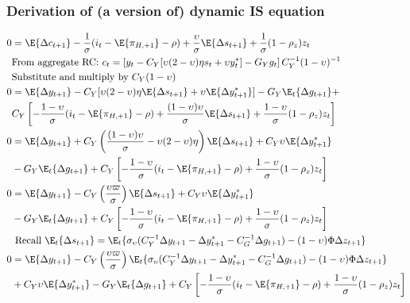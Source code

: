 \subsubsection{Derivation of (a version of) dynamic IS equation}
\begin{align}\label{eq:dynamic_is_beginning}
    0 &= \E \{ \Delta c_{t+1}\} - \frac{1}{\sigma}(i_t - \E \{ \pi_{H,+1}\} - \rho) + \frac{\upsilon}{\sigma}\E \{ \Delta s_{t+1} \} + \frac{1}{\sigma}(1-\rho_z)z_t \\
    &\text{From aggregate RC: $c_t = \left[ y_t - C_Y[\upsilon(2-\upsilon)\eta s_t + \upsilon y_t^*] - G_Y g_t\right] C_Y^{-1}(1-\upsilon)^{-1}$} \nonumber\\
    &\text{Substitute and multiply by $C_Y(1-\upsilon)$}\nonumber\\
    0  &= \E \{ \Delta y_{t+1}\}  - C_Y[\upsilon(2-\upsilon)\eta \E \{\Delta s_{t+1} \} + \upsilon \E \{\Delta y_{t+1}^* \}] -G_Y \E_t\{\Delta g_{t+1}\} + \nonumber\\ 
    &C_Y\left[- \frac{1-\upsilon}{\sigma}(i_t - \E \{ \pi_{H,+1}\} - \rho) + \frac{(1-\upsilon)\upsilon}{\sigma}\E \{ \Delta s_{t+1} \} + \frac{1-\upsilon}{\sigma}(1-\rho_z)z_t \right] \\
    0  &= \E \{ \Delta y_{t+1}\}  + C_Y\left(\frac{(1-\upsilon)\upsilon}{\sigma} - \upsilon(2-\upsilon)\eta\right) \E \{\Delta s_{t+1} \} + C_Y \upsilon \E \{\Delta y_{t+1}^* \} \nonumber\\ 
    &-G_Y \E_t\{\Delta g_{t+1}\} + C_Y\left[- \frac{1-\upsilon}{\sigma}(i_t - \E \{ \pi_{H,+1}\} - \rho)  + \frac{1-\upsilon}{\sigma}(1-\rho_z)z_t \right] \\
    0  &= \E \{ \Delta y_{t+1}\}  - C_Y\left(\frac{\upsilon \varpi}{\sigma}\right) \E \{\Delta s_{t+1} \} + C_Y \upsilon \E \{\Delta y_{t+1}^* \} \nonumber\\
     &-G_Y \E_t\{\Delta g_{t+1}\} + C_Y\left[- \frac{1-\upsilon}{\sigma}(i_t - \E \{ \pi_{H,+1}\} - \rho)  + \frac{1-\upsilon}{\sigma}(1-\rho_z)z_t \right] \\
     &\text{ Recall $\E_t \{ \Delta s_{t+1}\} = \E_t\{\sigma_\upsilon(C_Y^{-1} \Delta y_{t+1} - \Delta y^*_{t+1} - C_G^{-1} \Delta g_{t+1}) - (1-\upsilon)\Phi \Delta z_{t+1}\}$}\nonumber\\
    0 &= \E \{ \Delta y_{t+1}\}  - C_Y\left(\frac{\upsilon \varpi}{\sigma}\right) \E_t\{\sigma_\upsilon(C_Y^{-1} \Delta y_{t+1} - \Delta y^*_{t+1} - C_G^{-1} \Delta g_{t+1}) - (1-\upsilon)\Phi \Delta z_{t+1}\} \nonumber \\ 
    &+ C_Y \upsilon \E \{\Delta y_{t+1}^* \} -G_Y \E_t\{\Delta g_{t+1}\} + C_Y\left[- \frac{1-\upsilon}{\sigma}(i_t - \E \{ \pi_{H,+1}\} - \rho)  + \frac{1-\upsilon}{\sigma}(1-\rho_z)z_t \right] \\

\end{align}
